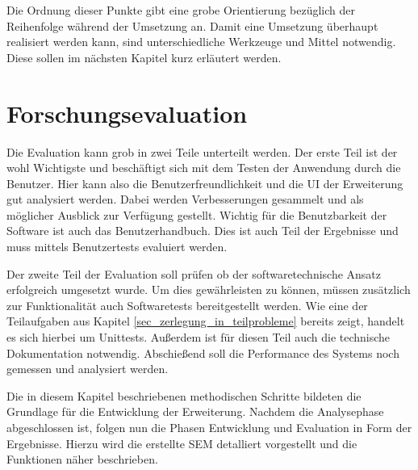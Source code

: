 Die Ordnung dieser Punkte gibt eine grobe Orientierung bezüglich der Reihenfolge
während der Umsetzung an. Damit eine Umsetzung überhaupt realisiert werden kann,
sind unterschiedliche Werkzeuge und Mittel notwendig. Diese sollen im nächsten Kapitel
kurz erläutert werden.

\section{Forschungsevaluation}
Die Evaluation kann grob in zwei Teile unterteilt werden. Der erste Teil ist der
wohl Wichtigste und beschäftigt sich mit dem Testen der Anwendung durch die
Benutzer. Hier kann also die Benutzerfreundlichkeit und die \ac{UI} der
Erweiterung gut analysiert werden. Dabei werden Verbesserungen gesammelt und als
möglicher Ausblick zur Verfügung gestellt. Wichtig für die Benutzbarkeit der
Software ist auch das Benutzerhandbuch. Dies ist auch Teil der Ergebnisse und muss
mittels Benutzertests evaluiert werden.

Der zweite Teil der Evaluation soll prüfen ob der softwaretechnische Ansatz erfolgreich
umgesetzt wurde. Um dies gewährleisten zu können, müssen zusätzlich zur Funktionalität
auch Softwaretests bereitgestellt werden. Wie eine der Teilaufgaben aus Kapitel
\ref{sec_zerlegung_in_teilprobleme} bereits zeigt, handelt es sich hierbei um Unittests.
Außerdem ist für diesen Teil auch die technische Dokumentation notwendig. Abschießend
soll die Performance des Systems noch gemessen und analysiert werden.

Die in diesem Kapitel beschriebenen methodischen Schritte bildeten die Grundlage
für die Entwicklung der Erweiterung. Nachdem die Analysephase abgeschlossen ist,
folgen nun die Phasen Entwicklung und Evaluation in Form der Ergebnisse. Hierzu
wird die erstellte \ac{SEM} detalliert vorgestellt und die Funktionen näher beschrieben.
